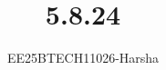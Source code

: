 \documentclass[journal]{IEEEtran}
\begin{document}

\vspace{3cm}

\title{5.8.24}
\author{EE25BTECH11026-Harsha}
 \maketitle
{\let\newpage\relax\maketitle}

\renewcommand{\thefigure}{\theenumi}
\renewcommand{\thetable}{\theenumi}
\setlength{\intextsep}{10pt} %


\renewcommand{\thetable}{\theenumi}
\end{document}
